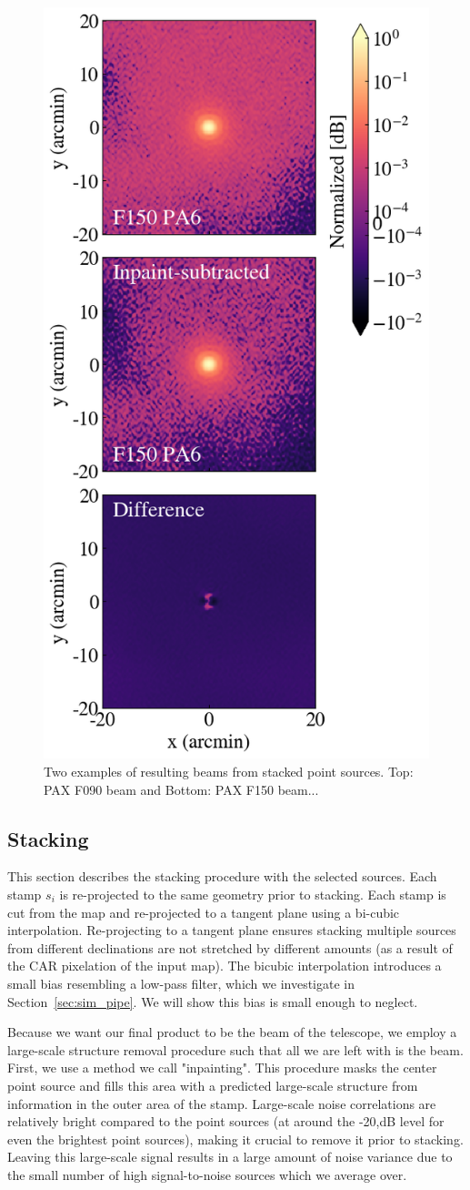 \begin{figure}[t]
    \centering
    \includegraphics[width=.3\textwidth]{Figures/inpainting.png}
    \caption{Two examples of resulting beams from stacked point sources.  Top: PAX F090 beam and Bottom: PAX F150 beam...}
    \label{fig:example_maps}
    \vspace{1em}
\end{figure}

\subsection{Stacking}
\label{subsec:stacking}
This section describes the stacking procedure with the selected sources.  Each stamp $s_i$ is re-projected to the same geometry prior to stacking.  Each stamp is cut from the map and re-projected to a tangent plane using a bi-cubic interpolation.  Re-projecting to a tangent plane ensures stacking multiple sources from different declinations are not stretched by different amounts (as a result of the CAR pixelation of the input map).  The bicubic interpolation introduces a small bias resembling a low-pass filter, which we investigate in Section~\ref{sec:sim_pipe}.  We will show this bias is small enough to neglect.

Because we want our final product to be the beam of the telescope, we employ a large-scale structure removal procedure such that all we are left with is the beam.  First, we use a method we call "inpainting".  This procedure masks the center point source and fills this area with a predicted large-scale structure from information in the outer area of the stamp.  Large-scale noise correlations are relatively bright compared to the point sources (at around the -20,dB level for even the brightest point sources), making it crucial to remove it prior to stacking.  Leaving this large-scale signal results in a large amount of noise variance due to the small number of high signal-to-noise sources which we average over. 
 
